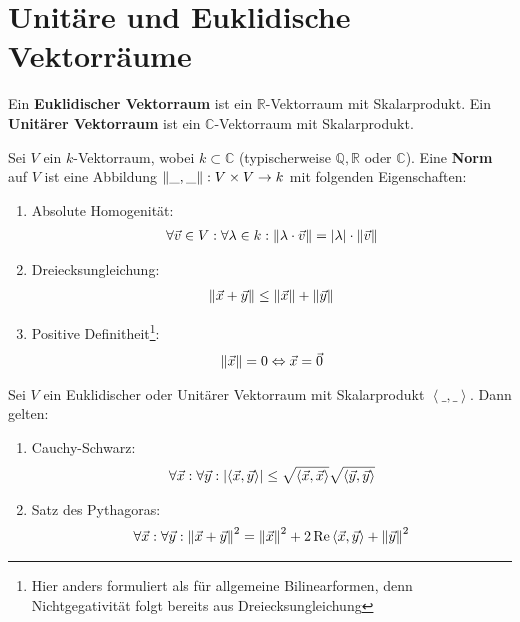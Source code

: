 \documentclass{report}
\newcommand{\tbf}[1]{\textbf{#1}}
\newcommand{\bC}{\mathbb{C}}
\newcommand{\bQ}{\mathbb{Q}}
\newcommand{\bR}{\mathbb{R}}
\newcommand{\vv}{\vec{v}}
\newcommand{\vx}{\vec{x}}
\newcommand{\vy}{\vec{y}}
\newcommand{\vz}{\vec{0}}
\newcommand{\scalar}[2]{\left\langle #1, #2 \right\rangle}
\begin{document}
\section{Unitäre und Euklidische Vektorräume}
\begin{definition}
 Ein \tbf{Euklidischer Vektorraum} ist ein $\bR$-Vektorraum mit Skalarprodukt. Ein \tbf{Unitärer Vektorraum} ist ein $\bC$-Vektorraum mit Skalarprodukt.
\end{definition}
\begin{definition}
 Sei $V$ ein $k$-Vektorraum, wobei $k \subset \bC$ (typischerweise $\bQ, \bR$ oder $\bC$). Eine \tbf{Norm} auf $V$ ist eine Abbildung $\norm{\_,\_} : V \times V \to k$ mit folgenden Eigenschaften:
 \begin{enumerate}
  \item Absolute Homogenität:
  \begin{align*}
   \forall \vv \in V : \forall \lambda \in k : \norm{\lambda \cdot \vv} = \abs{\lambda} \cdot \norm{\vv}
  \end{align*}
  \item Dreiecksungleichung:
  \begin{align*}
   \norm{\vx + \vy} \leq \norm{\vx} + \norm{\vy}
  \end{align*}
  \item Positive Definitheit\footnote{Hier anders formuliert als für allgemeine Bilinearformen, denn Nichtgegativität folgt bereits aus Dreiecksungleichung}:
  \begin{align*}
   \norm{\vx} = 0 \Leftrightarrow \vx = \vz
  \end{align*}
 \end{enumerate}
\end{definition}
\begin{beispiel}
 Sei $V$ ein Euklidischer oder Unitärer Vektorraum mit Skalarprodukt $\scalar{\_}{\_}$. Dann gelten:
 \begin{enumerate}
  \item Cauchy-Schwarz:
  \begin{align*}
   \forall \vx : \forall \vy : \abs{\scalar{\vx}{\vy}} \leq \sqrt{\scalar{\vx}{\vx}} \sqrt{\scalar{\vy}{\vy}}
  \end{align*}
  \item Satz des Pythagoras:
  \begin{align*}
   \forall \vx : \forall \vy : \norm{\vx + \vy}^2 = \norm{\vx}^2 + 2 \Re\scalar{\vx}{\vy} + \norm{\vy}^2
  \end{align*}
 \end{enumerate}
\end{beispiel}
\end{document}
